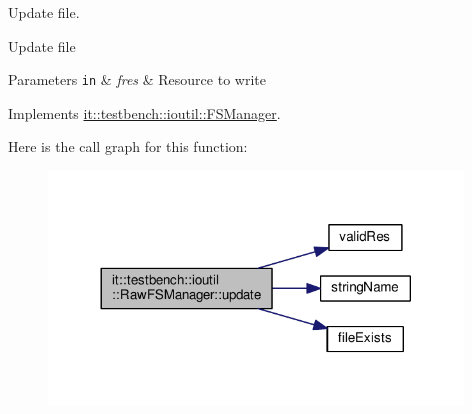 Update file. 

Update file


\begin{DoxyParams}[1]{Parameters}
\mbox{\tt in}  & {\em fres} & Resource to write \\
\hline
\end{DoxyParams}


Implements \hyperlink{classit_1_1testbench_1_1ioutil_1_1FSManager_a88acc0f8998e26cd947b722f18feac13}{it\-::testbench\-::ioutil\-::\-F\-S\-Manager}.



Here is the call graph for this function\-:
\nopagebreak
\begin{figure}[H]
\begin{center}
\leavevmode
\includegraphics[width=312pt]{d0/d54/classit_1_1testbench_1_1ioutil_1_1RawFSManager_a642d25f0c2a326c922583a0dc06474dd_cgraph}
\end{center}
\end{figure}




